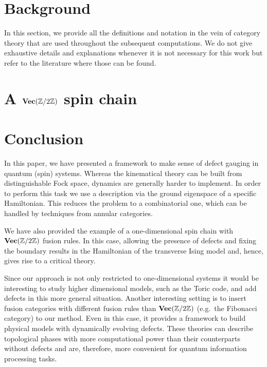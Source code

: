 \section{Background}\label{S:defs}
In this section, we provide all the definitions and notation in the vein of category theory that are used throughout the subsequent computations. We do not give exhaustive details and explanations whenever it is not necessary for this work but refer to the literature where those can be found.







\section{A $\textbf{Vec}(\mathbb{Z}/2\mathbb{Z})$ spin chain}




\section{Conclusion}
\label{Conclusion}
In this paper, we have presented a framework to make sense of defect gauging in quantum (spin) systems. Whereas the kinematical theory can be built from distinguishable Fock space, dynamics are generally harder to implement. In order to perform this task we use a description via the ground eigenspace of a specific Hamiltonian. This reduces the problem to a combinatorial one, which can be handled by techniques from annular categories.

We have also provided the example of a one-dimensional spin chain with $\textbf{Vec}(\mathbb{Z}/2\mathbb{Z})$ fusion rules. In this case, allowing the presence of defects and fixing the boundary results in the Hamiltonian of the transverse Ising model and, hence, gives rise to a critical theory.

Since our approach is not only restricted to one-dimensional systems it would be interesting to study higher dimensional models, such as the Toric code, and add defects in this more general situation. Another interesting setting is to insert fusion categories with different fusion rules than $\textbf{Vec}(\mathbb{Z}/2\mathbb{Z})$ (e.g.\ the Fibonacci category) to our method. Even in this case, it provides a framework to build physical models with dynamically evolving defects. These theories can describe topological phases with more computational power than their counterparts without defects and are, therefore, more convenient for quantum information processing tasks.









%
